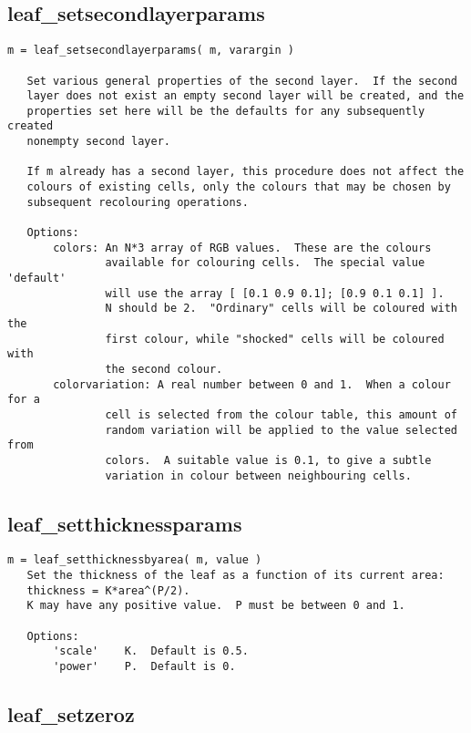 \subsection{leaf\_setsecondlayerparams}\label{section-leaf-setsecondlayerparams}

\begin{verbatim}
m = leaf_setsecondlayerparams( m, varargin )

   Set various general properties of the second layer.  If the second
   layer does not exist an empty second layer will be created, and the
   properties set here will be the defaults for any subsequently created
   nonempty second layer.

   If m already has a second layer, this procedure does not affect the
   colours of existing cells, only the colours that may be chosen by
   subsequent recolouring operations.

   Options:
       colors: An N*3 array of RGB values.  These are the colours
               available for colouring cells.  The special value 'default'
               will use the array [ [0.1 0.9 0.1]; [0.9 0.1 0.1] ].
               N should be 2.  "Ordinary" cells will be coloured with the
               first colour, while "shocked" cells will be coloured with
               the second colour.
       colorvariation: A real number between 0 and 1.  When a colour for a
               cell is selected from the colour table, this amount of
               random variation will be applied to the value selected from
               colors.  A suitable value is 0.1, to give a subtle
               variation in colour between neighbouring cells.
\end{verbatim}

\subsection{leaf\_setthicknessparams}\label{section-leaf-setthicknessparams}

\begin{verbatim}
m = leaf_setthicknessbyarea( m, value )
   Set the thickness of the leaf as a function of its current area:
   thickness = K*area^(P/2).
   K may have any positive value.  P must be between 0 and 1.

   Options:
       'scale'    K.  Default is 0.5.
       'power'    P.  Default is 0.
\end{verbatim}

\subsection{leaf\_setzeroz}\label{section-leaf-setzeroz}

